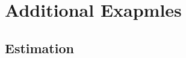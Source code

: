 \documentclass[11pt,fleqn]{book} %
\begin{document}



\chapter{Additional Exapmles}


\section{Estimation}
\end{document}
